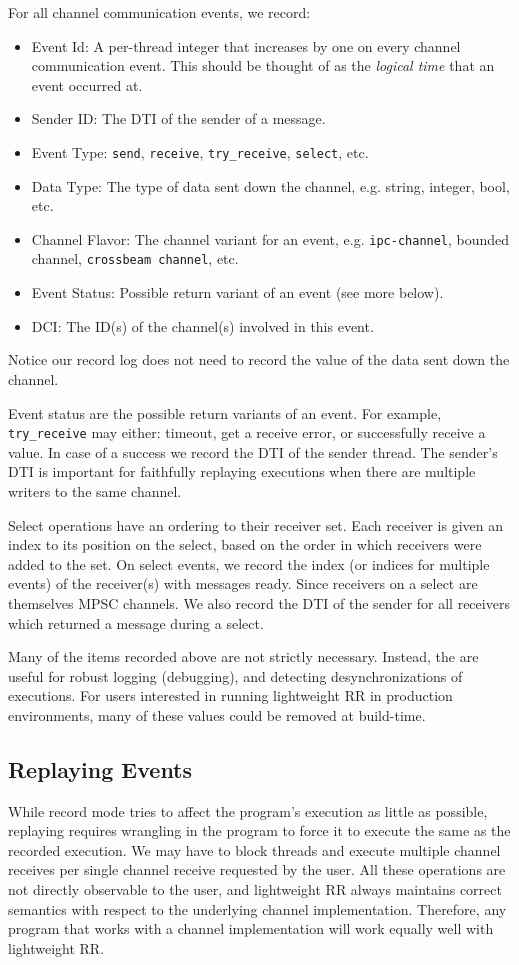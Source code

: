 \documentclass{article}
\begin{document}
For all channel communication events, we record:
\begin{itemize}
\item Event Id: A per-thread integer that increases by one on every channel communication
  event. This should be thought of as the \textit{logical time} that an event occurred at.
\item Sender ID: The DTI of the sender of a message.
\item Event Type: \texttt{send}, \texttt{receive}, \texttt{try\_receive}, \texttt{select}, etc.
\item Data Type: The type of data sent down the channel, e.g. string, integer, bool, etc.
\item Channel Flavor: The channel variant for an event, e.g. \texttt{ipc-channel}, bounded channel,
  \texttt{crossbeam channel}, etc.
\item Event Status: Possible return variant of an event (see more below).
\item DCI: The ID(s) of the channel(s) involved in this event.
\end{itemize}
Notice our record log does not need to record the value of the data sent down the channel.

Event status are the possible return variants of an event. For example, \texttt{try\_receive}
may either: timeout, get a receive error, or successfully receive a value. In case of a
success we record the DTI of the sender thread. The sender's DTI is
important for faithfully replaying executions when there are multiple writers
to the same channel.

Select operations have an ordering to their receiver set. Each receiver is given
an index to its position on the select, based on the order in which receivers were added to
the set. On select events, we record the index (or indices for multiple events) of the
receiver(s) with messages ready. Since receivers on a select are themselves MPSC channels. We
also record the DTI of the sender for all receivers which returned a message during a select.

Many of the items recorded above are not strictly necessary. Instead, the are useful for
robust logging (debugging), and detecting desynchronizations of executions. For users
interested in running lightweight RR in production environments, many of these values could
be removed at build-time.

\subsection{Replaying Events}
While record mode tries to affect the program's execution as little as possible,
replaying requires wrangling in the program to force it to execute the same as the recorded
execution. We may have to block threads and execute multiple channel receives
per single channel receive requested by the user. All these operations are not directly
observable to the user, and lightweight RR always maintains correct semantics with respect
to the underlying channel implementation. Therefore, any program that works with a channel
implementation will work equally well with lightweight RR.
\end{document}
